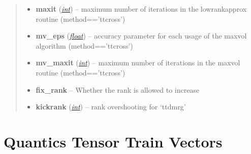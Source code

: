 \documentclass[a4paper,10pt,english]{sphinxmanual}
\begin{document}
\begin{fulllineitems}
\begin{fulllineitems}
\begin{quote}
\begin{description}
\begin{itemize}
\item {} 
\textbf{maxit} (\href{http://docs.python.org/library/functions.html\#int}{\emph{int}}) -- maximum number of iterations in the lowrankapprox routine (method=='ttcross')

\item {} 
\textbf{mv\_eps} (\href{http://docs.python.org/library/functions.html\#float}{\emph{float}}) -- accuracy parameter for each usage of the maxvol algorithm (method=='ttcross')

\item {} 
\textbf{mv\_maxit} (\href{http://docs.python.org/library/functions.html\#int}{\emph{int}}) -- maximum number of iterations in the maxvol routine (method=='ttcross')

\item {} 
\textbf{fix\_rank} -- Whether the rank is allowed to increase

\item {} 
\textbf{kickrank} (\href{http://docs.python.org/library/functions.html\#int}{\emph{int}}) -- rank overshooting for `ttdmrg'

\end{itemize}

\end{description}\end{quote}

\end{fulllineitems}


\end{fulllineitems}



\section{Quantics Tensor Train Vectors}
\label{api-qttvec::doc}\label{api-qttvec:quantics-tensor-train-vectors}\label{api-qttvec:module-TensorToolbox}
\end{document}
